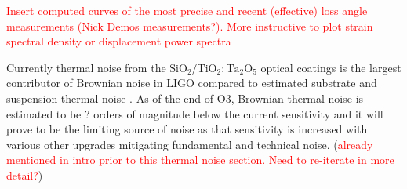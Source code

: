 \textcolor{red}{Insert computed curves of the most precise and recent (effective) loss angle measurements (Nick Demos measurements?). More instructive to plot strain spectral density or displacement power spectra}

\noindent Currently thermal noise from the $\mathrm{SiO_2}/\mathrm{TiO_2:Ta_2O_5}$ optical coatings is the largest contributor of Brownian noise in LIGO compared to estimated substrate and suspension thermal noise \cite{Harry:06}. As of the end of O3, Brownian thermal noise is estimated to be ? orders of magnitude below the current sensitivity and it will prove to be the limiting source of noise as that sensitivity is increased with various other upgrades mitigating fundamental and technical noise. (\textcolor{red}{already mentioned in intro prior to this thermal noise section. Need to re-iterate in more detail?})

